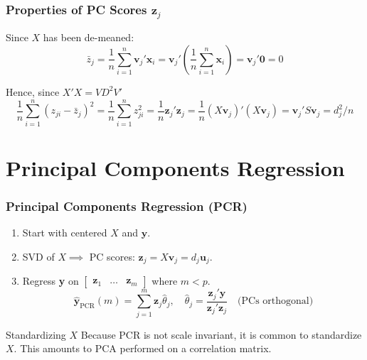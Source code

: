 \begin{frame}
  \frametitle{Properties of PC Scores $\mathbf{z}_j$}

  Since $X$ has been de-meaned:
  \[
    \bar{z}_j = \frac{1}{n}\sum_{i=1}^n \mathbf{v}_j'\mathbf{x}_i = \mathbf{v}_j' \left( \frac{1}{n}\sum_{i=1}^n \mathbf{x}_i \right) = \mathbf{v}_j' \mathbf{0} = 0
  \]

  Hence, since $X'X = VD^2V'$
  \[
    \frac{1}{n}\sum_{i=1}^n (z_{ji} - \bar{z}_j)^2 = \frac{1}{n} \sum_{i=1}^n z_{ji}^2 = \frac{1}{n} \mathbf{z}_j'\mathbf{z}_j = \frac{1}{n}\left( X\mathbf{v}_j \right)'\left( X\mathbf{v}_j \right) = \mathbf{v}_j' S\mathbf{v}_j = d_j^2/n
  \]

  
\end{frame}
\section{Principal Components Regression}
\begin{frame}
  \frametitle{Principal Components Regression (PCR)}

	\begin{enumerate}
    \item Start with centered $X$ and $\mathbf{y}$.
    \item SVD of $X \implies$ PC scores: $\mathbf{z}_j = X \mathbf{v}_j =  d_j \mathbf{u}_j$.
    \item Regress \textbf{y} on $[\begin{array}{ccc} \mathbf{z}_1 & \hdots & \mathbf{z}_m\end{array}]$ where $m < p$.
      \vspace{-0.5em}
      \[
        \widehat{\mathbf{y}}_{\text{PCR}}(m) =\sum_{j = 1}^m \mathbf{z}_j\widehat{\theta}_j, \quad 
        \widehat{\theta}_j = \frac{\mathbf{z}_j' \mathbf{y}}{\mathbf{z}_j' \mathbf{z}_j} \quad \text{(PCs orthogonal)} 
      \]
	\end{enumerate}

\begin{alertblock}{Standardizing $X$}
  Because PCR is not scale invariant, it is common to standardize $X$. This amounts to PCA performed on a \alert{correlation} matrix.
\end{alertblock}



\end{frame}
